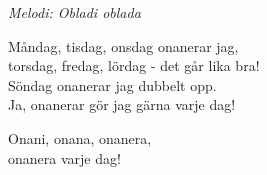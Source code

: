 {\footnotesize\textit{Melodi: Obladi oblada}}\par
\vspace{10pt}
Måndag, tisdag, onsdag onanerar jag,\\
torsdag, fredag, lördag - det går lika bra!\\
Söndag onanerar jag dubbelt opp.\\
Ja, onanerar gör jag gärna varje dag!\par
\vspace{10pt}
\revrpt Onani, onana, onanera,\\
onanera varje dag!\rpt
